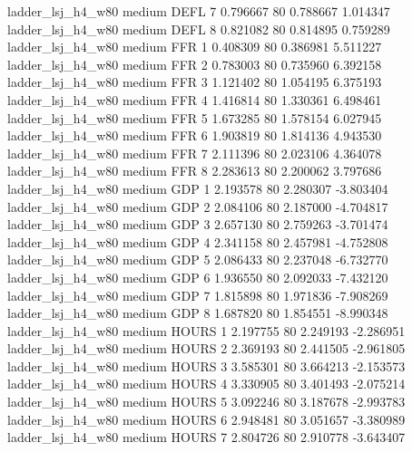   ladder_lsj_h4_w80     medium     DEFL                 7  0.796667 80       0.788667           1.014347
  ladder_lsj_h4_w80     medium     DEFL                 8  0.821082 80       0.814895           0.759289
  ladder_lsj_h4_w80     medium      FFR                 1  0.408309 80       0.386981           5.511227
  ladder_lsj_h4_w80     medium      FFR                 2  0.783003 80       0.735960           6.392158
  ladder_lsj_h4_w80     medium      FFR                 3  1.121402 80       1.054195           6.375193
  ladder_lsj_h4_w80     medium      FFR                 4  1.416814 80       1.330361           6.498461
  ladder_lsj_h4_w80     medium      FFR                 5  1.673285 80       1.578154           6.027945
  ladder_lsj_h4_w80     medium      FFR                 6  1.903819 80       1.814136           4.943530
  ladder_lsj_h4_w80     medium      FFR                 7  2.111396 80       2.023106           4.364078
  ladder_lsj_h4_w80     medium      FFR                 8  2.283613 80       2.200062           3.797686
  ladder_lsj_h4_w80     medium      GDP                 1  2.193578 80       2.280307          -3.803404
  ladder_lsj_h4_w80     medium      GDP                 2  2.084106 80       2.187000          -4.704817
  ladder_lsj_h4_w80     medium      GDP                 3  2.657130 80       2.759263          -3.701474
  ladder_lsj_h4_w80     medium      GDP                 4  2.341158 80       2.457981          -4.752808
  ladder_lsj_h4_w80     medium      GDP                 5  2.086433 80       2.237048          -6.732770
  ladder_lsj_h4_w80     medium      GDP                 6  1.936550 80       2.092033          -7.432120
  ladder_lsj_h4_w80     medium      GDP                 7  1.815898 80       1.971836          -7.908269
  ladder_lsj_h4_w80     medium      GDP                 8  1.687820 80       1.854551          -8.990348
  ladder_lsj_h4_w80     medium    HOURS                 1  2.197755 80       2.249193          -2.286951
  ladder_lsj_h4_w80     medium    HOURS                 2  2.369193 80       2.441505          -2.961805
  ladder_lsj_h4_w80     medium    HOURS                 3  3.585301 80       3.664213          -2.153573
  ladder_lsj_h4_w80     medium    HOURS                 4  3.330905 80       3.401493          -2.075214
  ladder_lsj_h4_w80     medium    HOURS                 5  3.092246 80       3.187678          -2.993783
  ladder_lsj_h4_w80     medium    HOURS                 6  2.948481 80       3.051657          -3.380989
  ladder_lsj_h4_w80     medium    HOURS                 7  2.804726 80       2.910778          -3.643407
